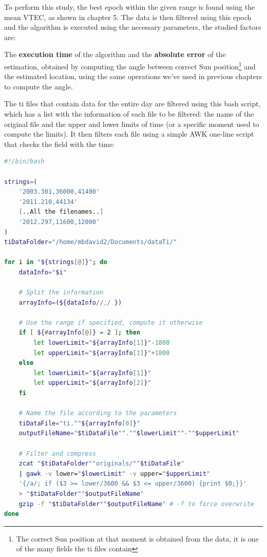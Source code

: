 To perform this study, the best epoch within the given range is found using the mean VTEC, as shown in chapter 5. The data is then filtered using this epoch and the algorithm is executed using the necessary parameters, the studied factors are:

The \textbf{execution time} of the algorithm and the \textbf{absolute error} of the estimation, obtained by computing the angle between correct Sun position\footnote{The correct Sun position at that moment is obtained from the data, it is one of the many fields the ti files contain} and the estimated location, using the same operations we've used in previous chapters to compute the angle. 

The ti files that contain data for the entire day are filtered using this bash script, which has a list with the information of each file to be filtered: the name of the original file and the upper and lower limits of time (or a specific moment used to compute the limits). It then filters each file using a simple AWK one-line script that checks the field with the time:

\begin{minipage}{\linewidth}
	\begin{lstlisting}[language=Bash, caption=Filtering the ti file]
#!/bin/bash	
	
strings=(
	'2003.301,36000,41400'
	'2011.210,44134'
	[..All the filenames..] 
	'2012.297,11600,12000'
)
tiDataFolder="/home/mbdavid2/Documents/dataTi/"

for i in "${strings[@]}"; do
	dataInfo="$i"
	
	# Split the information
	arrayInfo=(${dataInfo//,/ })
	
	# Use the range if specified, compute it otherwise
	if [ ${#arrayInfo[@]} = 2 ]; then
		let lowerLimit="${arrayInfo[1]}"-1800
		let upperLimit="${arrayInfo[1]}"+1800
	else
		let lowerLimit="${arrayInfo[1]}"
		let upperLimit="${arrayInfo[2]}"
	fi
	
	# Name the file according to the parameters
	tiDataFile="ti.""${arrayInfo[0]}"
	outputFileName="$tiDataFile"".""$lowerLimit""-""$upperLimit"
	
	# Filter and compress
	zcat "$tiDataFolder""originals/""$tiDataFile" 
	| gawk -v lower="$lowerLimit" -v upper="$upperLimit" 
	'{/a/; if ($3 >= lower/3600 && $3 <= upper/3600) {print $0;}}' 
	> "$tiDataFolder""$outputFileName"
	gzip -f "$tiDataFolder""$outputFileName" # -f to force overwrite
done\end{lstlisting}
\end{minipage}


